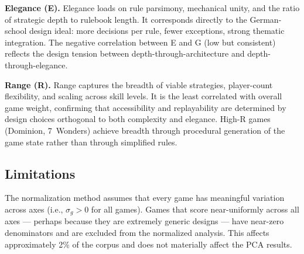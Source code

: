 \textbf{Elegance (E).} Elegance loads on rule parsimony, mechanical unity, and the
ratio of strategic depth to rulebook length. It corresponds directly to the
German-school design ideal: more decisions per rule, fewer exceptions, strong
thematic integration. The negative correlation between E and G (low but consistent)
reflects the design tension between depth-through-architecture and depth-through-elegance.

\textbf{Range (R).} Range captures the breadth of viable strategies, player-count
flexibility, and scaling across skill levels. It is the least correlated with overall
game weight, confirming that accessibility and replayability are determined by design
choices orthogonal to both complexity and elegance. High-R games (Dominion, 7~Wonders)
achieve breadth through procedural generation of the game state rather than through
simplified rules.

\subsection{Limitations}

The normalization method assumes that every game has meaningful variation across axes
(i.e., $\sigma_g > 0$ for all games). Games that score near-uniformly across all axes
--- perhaps because they are extremely generic designs --- have near-zero denominators
and are excluded from the normalized analysis. This affects approximately 2\% of the
corpus and does not materially affect the PCA results.
